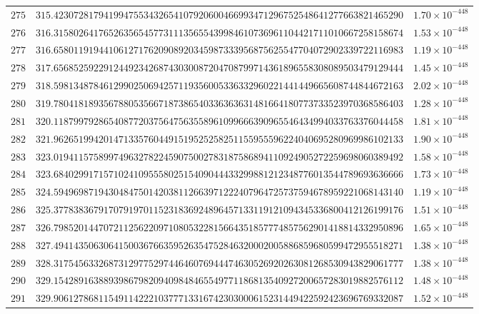 \documentclass[12pt,reqno]{amsart}
\theoremstyle{remark}
\begin{document}
\begin{longtable}{clc}
$275$ & $315.4230728179419947553432654107920600466993471296752548641277663821465290$ & $1.70\times 10^{-448}$ \\
$276$ & $316.3158026417652635654577311135655439984610736961104421711010667258158674$ & $1.53\times 10^{-448}$ \\
$277$ & $316.6580119194410612717620908920345987333956875625547704072902339722116983$ & $1.19\times 10^{-448}$ \\
$278$ & $317.6568525922912449234268743030087204708799714361896558308089503479129444$ & $1.45\times 10^{-448}$ \\
$279$ & $318.5981348784612990250694257119356005336332960221441449665608744844672163$ & $2.02\times 10^{-448}$ \\
$280$ & $319.7804181893567880535667187386540336363631481664180773733523970368586403$ & $1.28\times 10^{-448}$ \\
$281$ & $320.1187997928654087720375647563558961099666390965546434994033763376044458$ & $1.81\times 10^{-448}$ \\
$282$ & $321.9626519942014713357604491519525258251155955596224040695280969986102133$ & $1.90\times 10^{-448}$ \\
$283$ & $323.0194115758997496327822459075002783187586894110924905272259698060389492$ & $1.58\times 10^{-448}$ \\
$284$ & $323.6840299171571024109555802515409044433299881212348776013544789693636666$ & $1.73\times 10^{-448}$ \\
$285$ & $324.5949698719430484750142038112663971222407964725737594678959221068143140$ & $1.19\times 10^{-448}$ \\
$286$ & $325.3778383679170791970115231836924896457133119121094345336800412126199176$ & $1.51\times 10^{-448}$ \\
$287$ & $326.7985201447072112562209710805322815664351857774857562901418814332950896$ & $1.65\times 10^{-448}$ \\
$288$ & $327.4941435063064150036766359526354752846320002005886859680599472955518271$ & $1.38\times 10^{-448}$ \\
$289$ & $328.3175456332687312977529744646076944474630526920263081268530943829061777$ & $1.38\times 10^{-448}$ \\
$290$ & $329.1542891638893986798209409848465549771186813540927200657283019882576112$ & $1.48\times 10^{-448}$ \\
$291$ & $329.9061278681154911422210377713316742303000615231449422592423696769332087$ & $1.52\times 10^{-448}$ \\

\end{longtable}
\end{document}
